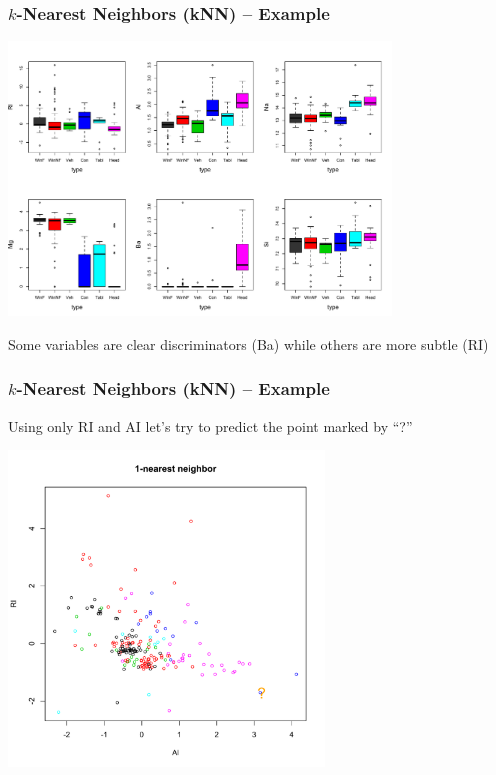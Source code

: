 \documentclass[flegn]{beamer}
\begin{document}
\begin{frame}
\frametitle{$k$-Nearest Neighbors (kNN) -- Example}

\vspace{-0.7cm}

\begin{center}
\includegraphics[width=4in]{glass1}
\end{center}

\vspace{-0.3cm}
Some variables are clear discriminators {\color{blue}(Ba)} while others are more subtle {\color{red}(RI)}
\end{frame}


\begin{frame}
\frametitle{$k$-Nearest Neighbors (kNN) -- Example}

Using only RI and AI let's try to predict the point marked by ``?''
\vspace{-0.5cm} 

\begin{center}
\includegraphics[width=3.3in]{knn1}
\end{center}

\end{frame}
\end{document}
